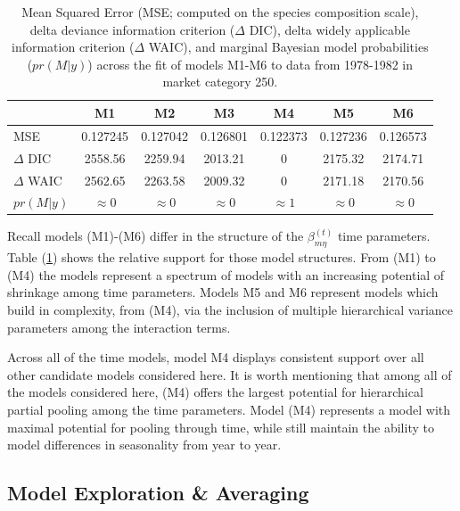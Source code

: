 \documentclass[12pt]{article}
\begin{document}
\begin{table}[h!]
\centering
\begin{tabular}[c]{@{}lcccccc@{}}
\hline
& M1 & M2 & M3 & M4 & M5 & M6 \\ \hline
MSE & 0.127245 & 0.127042 & 0.126801 & 0.122373 & 0.127236 & 0.126573 \\ %
\(\Delta\) DIC & 2558.56 & 2259.94 & 2013.21 & 0 & 2175.32 & 2174.71 \\ %
\(\Delta\) WAIC & 2562.65 & 2263.58 & 2009.32 & 0 & 2171.18 & 2170.56 \\ %
\(pr(M|y)\) & \(\approx0\) & \(\approx0\) & \(\approx0\) & \(\approx1\) & \(\approx0\) & \(\approx0\) \\ \hline
\end{tabular}
\caption{Mean Squared Error (MSE; computed on the species
composition scale), delta deviance information criterion (\(\Delta\) DIC),
delta widely applicable information criterion (\(\Delta\) WAIC), and marginal
Bayesian model probabilities (\(pr(M|y)\)) across the fit of models M1-M6 to 
data from 1978-1982 in market category 250.}
\label{priorTab}
\end{table}

Recall models (M1)-(M6) differ in the structure of the \(\beta^{(t)}_{m\eta}\) 
time parameters. Table (\ref{priorTab}) shows the relative support for those 
model structures. From (M1) to (M4) the models represent a spectrum of models 
with an increasing potential of shrinkage among time parameters. Models 
M5 and M6 represent models which build in complexity, from (M4), via 
the inclusion of multiple hierarchical variance parameters among 
the interaction terms.

Across all of the time models, model M4 displays consistent support over
all other candidate models considered here. It is worth mentioning that
among all of the models considered here, (M4) offers the largest
potential for hierarchical partial pooling among the time parameters.
Model (M4) represents a model with maximal potential for pooling through
time, while still maintain the ability to model differences in
seasonality from year to year.

\subsection{Model Exploration \& Averaging}\label{model-exploration-averaging-1}
\end{document}
